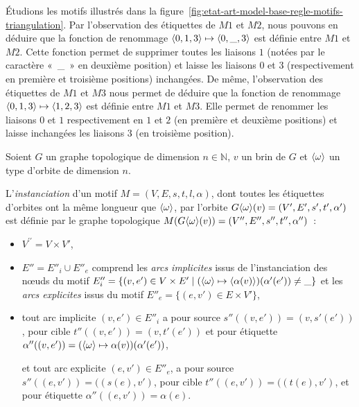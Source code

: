 Étudions les motifs illustrés dans la
figure~\ref{fig:etat-art-model-base-regle-motifs-triangulation}. %
Par l'observation des étiquettes de $M1$ et $M2$, nous pouvons en déduire que la
fonction de renommage $\langle0,1,3\rangle\mapsto\langle0,\_,3\rangle$ est définie entre $M1$ et
$M2$. %
Cette fonction permet de supprimer toutes les liaisons $1$ (notées par le
caractère «~\_~» en deuxième position) et laisse les liaisons $0$ et $3$
(respectivement en première et troisième positions) inchangées. %
De même, l'observation des étiquettes de $M1$ et $M3$ nous permet de déduire que
la fonction de renommage $\langle0,1,3\rangle \mapsto \langle1,2,3\rangle$ est définie entre $M1$
et $M3$. %
Elle permet de renommer les liaisons $0$ et $1$ respectivement en $1$ et $2$ (en
première et deuxième positions) et laisse inchangées les liaisons $3$ (en
troisième position). %

\begin{definition}\label{def:instanciation-motif}%
	Soient $G$ un graphe topologique de dimension $n \in \mathbb{N}$, $v$ un brin de $G$ et $\langle\omega\rangle$ un type d'orbite de dimension $n$.

	L'\emph{instanciation} d'un motif $M=(V,E,s,t,l,\alpha)$, dont toutes les étiquettes d'orbites ont la même longueur que $\langle\omega\rangle$, par l'orbite $G\langle\omega\rangle(v)=(V',E',s',t',\alpha')$ est définie par le graphe topologique $M(G\langle\omega\rangle(v))=(V'',E'',s'',t'',\alpha'')$~:
	\begin{itemize}
		\item $V^{\prime\prime}= V \times V'$,

		\item $E''=E''_i \cup E''_e$ comprend les \emph{arcs implicites} issus de l'instanciation des n\oe uds du motif $E''_i = \{ (v, e') \in V \times E' \mid (\langle\omega\rangle \mapsto \langle\alpha(v)\rangle)(\alpha'(e')) \neq \_ \}$ et les \emph{arcs explicites} issus du motif $E''_e = \{ (e, v') \in E \times V' \}$,

		\item tout arc implicite $(v,e') \in E''_i$ a pour source $s''((v,e'))=(v,s'(e'))$, pour cible $t''((v,e'))=(v,t'(e'))$ et pour étiquette $\alpha''((v,e'))=(\langle\omega\rangle \mapsto \alpha(v))(\alpha'(e'))$,

		      et tout arc explicite $(e,v') \in E''_e$, a pour source $s''((e,v')) = ((s(e),v')$, pour cible $t''((e,v')) = ((t(e),v')$, et pour étiquette $\alpha''((e, v')) = \alpha(e)$.
	\end{itemize}
\end{definition}

